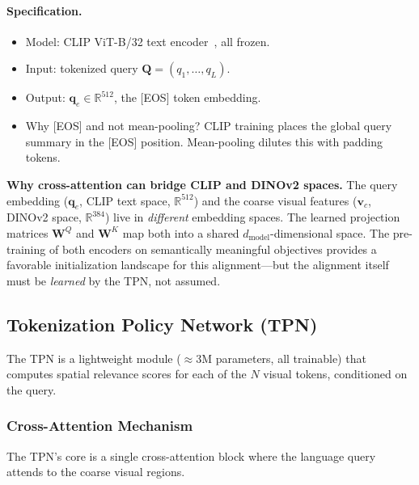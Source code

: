 \documentclass[12pt,a4paper]{article}
\newcommand{\R}{\mathbb{R}}
\newcommand{\vv}{\mathbf{v}}     %
\newcommand{\vq}{\mathbf{q}}     %
\newcommand{\mQ}{\mathbf{Q}}     %
\begin{document}
\paragraph{Specification.}
\begin{itemize}[leftmargin=2em]
  \item Model: CLIP ViT-B/32 text encoder~\citep{radford2021learning}, all frozen.
  \item Input: tokenized query $\mQ = (q_1, \ldots, q_L)$.
  \item Output: $\vq_e \in \R^{512}$, the [EOS] token embedding.
  \item Why [EOS] and not mean-pooling? CLIP training places the global query
    summary in the [EOS] position. Mean-pooling dilutes this with padding tokens.
\end{itemize}

\begin{intuitionbox}
  \textbf{Why cross-attention can bridge CLIP and DINOv2 spaces.}
  The query embedding ($\vq_e$, CLIP text space, $\R^{512}$) and the coarse
  visual features ($\vv_c$, DINOv2 space, $\R^{384}$) live in \emph{different}
  embedding spaces. The learned projection matrices $\mathbf{W}^Q$ and
  $\mathbf{W}^K$ map both into a shared $d_{\mathrm{model}}$-dimensional space.
  The pre-training of both encoders on semantically meaningful objectives
  provides a favorable initialization landscape for this alignment---but the
  alignment itself must be \emph{learned} by the TPN, not assumed.
\end{intuitionbox}

\subsection{Tokenization Policy Network (TPN)}
\label{subsec:tpn}

The TPN is a lightweight module ($\approx 3$M parameters, all trainable) that
computes spatial relevance scores for each of the $N$ visual tokens, conditioned
on the query.

\subsubsection{Cross-Attention Mechanism}

The TPN's core is a single cross-attention block where the language query attends
to the coarse visual regions.
\end{document}
